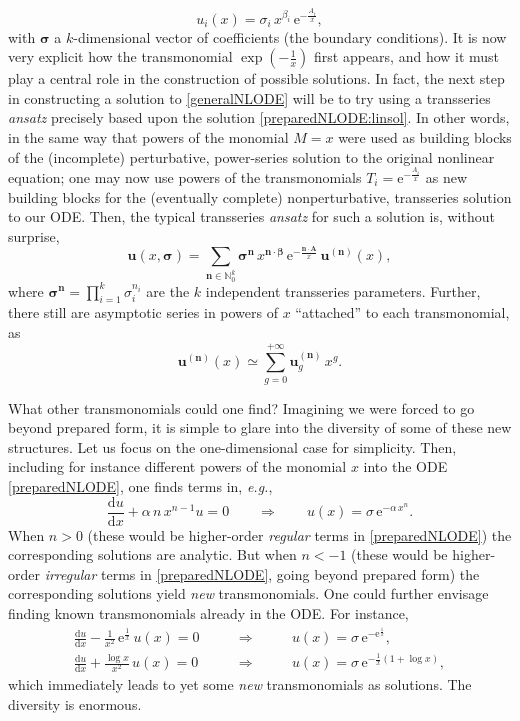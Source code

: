 \documentclass[11pt,a4paper]{article}
\def\BN{{\mathbb N}}
\newcommand{\be}{\begin{equation}}
\newcommand{\ee}{\end{equation}}
\newcommand{\bea}{\begin{eqnarray}}
\newcommand{\eea}{\end{eqnarray}}
\newcommand{\rme}{{\mathrm{e}}}
\newcommand{\rmd}{{\mathrm{d}}}
\begin{document}
%
\be
\label{preparedNLODE:linsol}
u_i (x) = \sigma_i\, x^{\beta_i}\, \rme^{-\frac{A_i}{x}},
\ee
%
\noindent
with $\boldsymbol{\sigma}$ a $k$-dimensional vector of coefficients (the boundary conditions). It is now very explicit how the transmonomial $\exp \left( - \frac{1}{x} \right)$ first appears, and how it must play a central role in the construction of possible solutions. In fact, the next step in constructing a solution to \eqref{generalNLODE} will be to try using a transseries \textit{ansatz} precisely based upon the solution \eqref{preparedNLODE:linsol}. In other words, in the same way that powers of the monomial $M = x$ were used as building blocks of the (incomplete) perturbative, power-series solution to the original nonlinear equation; one may now use powers of the transmonomials $T_i = \rme^{-\frac{A_i}{x}}$ as new building blocks for the (eventually complete) nonperturbative, transseries solution to our ODE. Then, the typical transseries \textit{ansatz} for such a solution is, without surprise,
%
\be
\label{vec-k-parameter-TS}
\boldsymbol{u} \left( x, \boldsymbol{\sigma} \right) = \sum_{\boldsymbol{n} \in \BN_0^k} \boldsymbol{\sigma}^{\boldsymbol{n}}\, x^{\boldsymbol{n} \cdot \boldsymbol{\beta}}\, \rme^{- \frac{\boldsymbol{n} \cdot \boldsymbol{A}}{x}}\, \boldsymbol{u}^{(\boldsymbol{n})} (x),
\ee
%
\noindent
where $\boldsymbol{\sigma}^{\boldsymbol{n}} = \prod_{i=1}^k \sigma_i^{n_i}$ are the $k$ independent transseries parameters. Further, there still are asymptotic series in powers of $x$ ``attached'' to each transmonomial, as
%
\be
\boldsymbol{u}^{(\boldsymbol{n})} (x) \simeq \sum_{g=0}^{+\infty} \boldsymbol{u}^{(\boldsymbol{n})}_g\, x^g.
\ee

What other transmonomials could one find? Imagining we were forced to go beyond prepared form, it is simple to glare into the diversity of some of these new structures. Let us focus on the one-dimensional case for simplicity. Then, including for instance different powers of the monomial $x$ into the ODE \eqref{preparedNLODE}, one finds terms in, \textit{e.g.},
%
\be
\frac{\rmd u}{\rmd x} + \alpha\, n\, x^{n-1} u = 0 \qquad \Rightarrow \qquad u (x) = \sigma\, \rme^{- \alpha\, x^n}.
\ee
%
\noindent
When $n>0$ (these would be higher-order \textit{regular} terms in \eqref{preparedNLODE}) the corresponding solutions are analytic. But when $n<-1$ (these would be higher-order \textit{irregular} terms in \eqref{preparedNLODE}, going beyond prepared form) the corresponding solutions yield \textit{new} transmonomials. One could further envisage finding known transmonomials already in the ODE. For instance,
%
\bea
\frac{\rmd u}{\rmd x} - \frac{1}{x^2}\, \rme^{\frac{1}{x}}\, u (x) = 0 \qquad &\Rightarrow& \qquad u (x) = \sigma\, \rme^{- \rme^{\frac{1}{x}}}, \\
\frac{\rmd u}{\rmd x} + \frac{\log x}{x^2}\, u (x) = 0 \qquad &\Rightarrow& \qquad u (x) = \sigma\, \rme^{- \frac{1}{x} \left( 1 + \log x \right)},
\eea
%
\noindent
which immediately leads to yet some \textit{new} transmonomials as solutions. The diversity is enormous.
\end{document}
